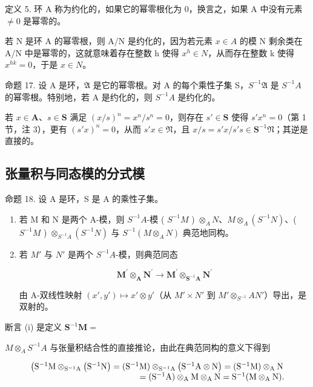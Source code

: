 定义 5. 环 A 称为约化的，如果它的幂零根化为 0，换言之，如果 A 中没有元素 \(\neq 0\) 是幂零的。

若 N 是环 A 的幂零根，则 A/N 是约化的，因为若元素 \(x \in A\) 的模 N 剩余类在 A/N 中是幂零的，这就意味着存在整数 h 使得 \(x^{h} \in N\)，从而存在整数 k 使得 \(x^{hk} = 0\)，于是 \(x \in N\)。

命题 17. 设 A 是环，\(\mathfrak{A}\) 是它的幂零根。对 A 的每个乘性子集 S，\(S^{-1}\mathfrak{A}\) 是 \(S^{-1}A\) 的幂零根。特别地，若 A 是约化的，则 \(S^{-1}A\) 是约化的。

若 \(x \in \mathbf{A}\)、\(s \in \mathbf{S}\) 满足 \((x / s)^n = x^n / s^n = 0\)，则存在 \(s' \in \mathbf{S}\) 使得 \(s' x^n = 0\)（第 1 节，注 3），更有 \((s' x)^n = 0\)，从而 \(s' x \in \mathfrak{N}\)，且 \(x / s = s' x / s' s \in \mathbf{S}^{-1} \mathfrak{N}\)；其逆是直接的。

\subsection{张量积与同态模的分式模}

命题 18. 设 A 是环，S 是 A 的乘性子集。

\begin{enumerate}
\def\labelenumi{(\roman{enumi})}
\tightlist
\item
  若 M 和 N 是两个 A-模，则 \(S^{-1}A\)-模 ( \(S^{-1}M\) ) \(\otimes_{A}N\)、\(M\otimes_{A}(S^{-1}N)\)、( \(S^{-1}M\) ) \(\otimes_{S^{-1}A}(S^{-1}N)\) 与 \(S^{-1}(M\otimes_{A}N)\) 典范地同构。
\item
  若 \(M'\) 与 \(N'\) 是两个 \(S^{-1}A\)-模，则典范同态

\[
\mathbf {M} ^ {\prime} \otimes_ {\mathbf {A}} \mathbf {N} ^ {\prime} \rightarrow \mathbf {M} ^ {\prime} \otimes_ {\mathbf {S} ^ {- 1} \mathbf {A}} \mathbf {N} ^ {\prime}
\]

由 A-双线性映射 \((x', y') \mapsto x' \otimes y'\)（从 \(M' \times N'\) 到 \(M' \otimes_{S^{-1}} A N'\)）导出，是双射的。

\end{enumerate}
断言 (i) 是定义 \(\mathbf{S}^{-1}\mathbf{M} =\)

\(M \otimes_{A} S^{-1} A\) 与张量积结合性的直接推论，由此在典范同构的意义下得到

\[
\begin{array}{r l} \left(\mathrm{S} ^ {- 1} \mathrm{M} \otimes_ {\mathrm{S} ^ {- 1} \mathrm{A}} \left(\mathrm{S} ^ {- 1} \mathrm{N}\right) = (\mathrm{S} ^ {- 1} \mathrm{M}) \otimes_ {\mathrm{S} ^ {- 1} \mathrm{A}} \left(\mathrm{S} ^ {- 1} \mathrm{A} \otimes \mathrm{N}\right) = (\mathrm{S} ^ {- 1} \mathrm{M}) \otimes_ {\mathrm{A}} \mathrm{N} \right. \\ = (\mathrm{S} ^ {- 1} \mathrm{A}) \otimes_ {\mathrm{A}} \mathrm{M} \otimes_ {\mathrm{A}} \mathrm{N} = \mathrm{S} ^ {- 1} (\mathrm{M} \otimes_ {\mathrm{A}} \mathrm{N}). \end{array}
\]

